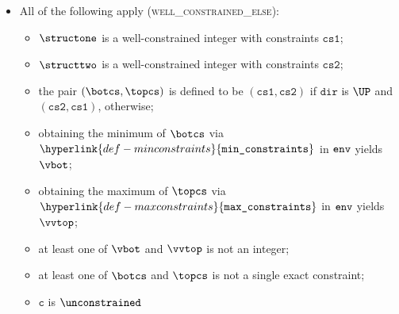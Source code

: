\documentclass{book}
\newcommand\minconstraints[0]{\hyperlink{def-minconstraints}{\texttt{min\_constraints}}}
\newcommand\maxconstraints[0]{\hyperlink{def-maxconstraints}{\texttt{max\_constraints}}}
\newcommand\vc[0]{\texttt{c}}
\newcommand\dir[0]{\texttt{dir}}
\newcommand\csone[0]{\texttt{cs1}}
\newcommand\cstwo[0]{\texttt{cs2}}
\begin{document}
\begin{itemize}
  \item All of the following apply (\textsc{well\_constrained\_else}):
  \begin{itemize}
    \item $\structone$ is a well-constrained integer with constraints $\csone$;
    \item $\structtwo$ is a well-constrained integer with constraints $\cstwo$;
    \item the pair $(\botcs, \topcs)$ is defined to be $(\csone, \cstwo)$ if $\dir$ is $\UP$ and $(\cstwo, \csone)$, otherwise;
    \item obtaining the minimum of $\botcs$ via $\minconstraints$ in $\texttt{env}$ yields $\vbot$;
    \item obtaining the maximum of $\topcs$ via $\maxconstraints$ in $\texttt{env}$ yields $\vvtop$;
    \item at least one of $\vbot$ and $\vvtop$ is not an integer;
    \item at least one of $\botcs$ and $\topcs$ is not a single exact constraint;
    \item $\vc$ is $\unconstrained$
  \end{itemize}
\end{itemize}
\end{document}
